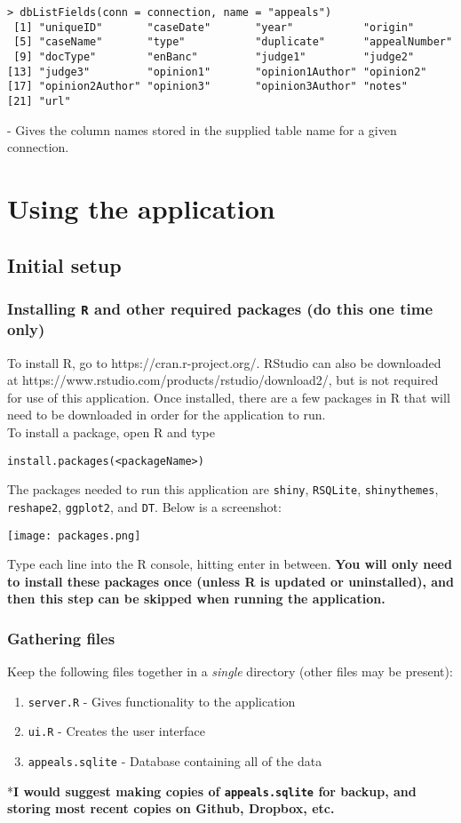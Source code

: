 \documentclass{article}
\begin{document}
\begin{verbatim}
> dbListFields(conn = connection, name = "appeals")
 [1] "uniqueID"       "caseDate"       "year"           "origin"        
 [5] "caseName"       "type"           "duplicate"      "appealNumber"  
 [9] "docType"        "enBanc"         "judge1"         "judge2"        
[13] "judge3"         "opinion1"       "opinion1Author" "opinion2"      
[17] "opinion2Author" "opinion3"       "opinion3Author" "notes"         
[21] "url"     
\end{verbatim}
- Gives the column names stored in the supplied table name for a given connection.


\section{Using the application}

\subsection{Initial setup}
\subsubsection{Installing {\tt R} and other required packages (do this one time only)}
To install R, go to https://cran.r-project.org/. RStudio can also be downloaded at https://www.rstudio.com/products/rstudio/download2/, but is not required for use of this application. Once installed, there are a few packages in R that will need to be downloaded in order for the application to run. \\

To install a package, open R and type
\begin{verbatim}
install.packages(<packageName>)
\end{verbatim}
The packages needed to run this application are {\tt shiny}, {\tt RSQLite}, {\tt shinythemes}, {\tt reshape2}, {\tt ggplot2}, and {\tt DT}. Below is a screenshot:
\begin{center}
\texttt{[image: packages.png]}
\end{center}
Type each line into the R console, hitting enter in between. {\bf You will only need to install these packages once (unless R is updated or uninstalled), and then this step can be skipped when running the application.}

\subsubsection{Gathering files}
Keep the following files together in a {\it single} directory (other files may be present):
\begin{enumerate}
\item {\tt server.R} - Gives functionality to the application
\item {\tt ui.R} - Creates the user interface 
\item {\tt appeals.sqlite} - Database containing all of the data 
\end{enumerate}
*{\bf I would suggest making copies of {\tt appeals.sqlite} for backup, and storing most recent copies on Github, Dropbox, etc.}
\end{document}
